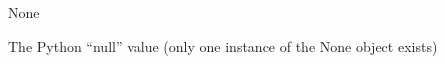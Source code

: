 \documentclass[
  letterpaper,
  DIV=11,
  numbers=noendperiod]{scrreprt}
\begin{document}
\begin{table}
\begin{minipage}[t]{\linewidth}
{\centering 

}

\end{minipage}%
\newline
\begin{minipage}[t]{\linewidth}

{\centering 

}

\end{minipage}%
\newline
\begin{minipage}[t]{\linewidth}

{\centering 

}

\end{minipage}%
\newline
\begin{minipage}[t]{\linewidth}

{\centering 

}

\end{minipage}%
\newline
\begin{minipage}[t]{\linewidth}

{\centering 

None

}

\end{minipage}%
\newline
\begin{minipage}[t]{\linewidth}

{\centering 

}

\end{minipage}%
\newline
\begin{minipage}[t]{\linewidth}

{\centering 

}

\end{minipage}%
\newline
\begin{minipage}[t]{\linewidth}

{\centering 

The Python ``null'' value (only one instance of the None object exists)

}

\end{minipage}%
\newline
\begin{minipage}[t]{\linewidth}


\end{minipage}
\end{table}
\end{document}

